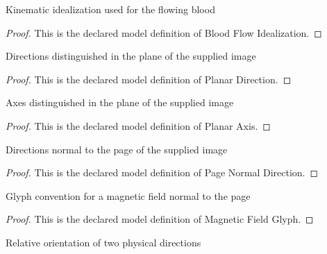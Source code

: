 \begin{definition}
  \label{def:physics:phyx-mini-0972:phyxminiproblems-problemphyxmini0972-bloodflowidealization}
  Kinematic idealization used for the flowing blood
\end{definition}
\begin{proof}
  This is the declared model definition of Blood Flow Idealization.
\end{proof}
\begin{definition}
  \label{def:physics:phyx-mini-0972:phyxminiproblems-problemphyxmini0972-planardirection}
  Directions distinguished in the plane of the supplied image
\end{definition}
\begin{proof}
  This is the declared model definition of Planar Direction.
\end{proof}
\begin{definition}
  \label{def:physics:phyx-mini-0972:phyxminiproblems-problemphyxmini0972-planaraxis}
  Axes distinguished in the plane of the supplied image
\end{definition}
\begin{proof}
  This is the declared model definition of Planar Axis.
\end{proof}
\begin{definition}
  \label{def:physics:phyx-mini-0972:phyxminiproblems-problemphyxmini0972-pagenormaldirection}
  Directions normal to the page of the supplied image
\end{definition}
\begin{proof}
  This is the declared model definition of Page Normal Direction.
\end{proof}
\begin{definition}
  \label{def:physics:phyx-mini-0972:phyxminiproblems-problemphyxmini0972-magneticfieldglyph}
  Glyph convention for a magnetic field normal to the page
\end{definition}
\begin{proof}
  This is the declared model definition of Magnetic Field Glyph.
\end{proof}
\begin{definition}
  \label{def:physics:phyx-mini-0972:phyxminiproblems-problemphyxmini0972-relativeorientation}
  Relative orientation of two physical directions
\end{definition}
